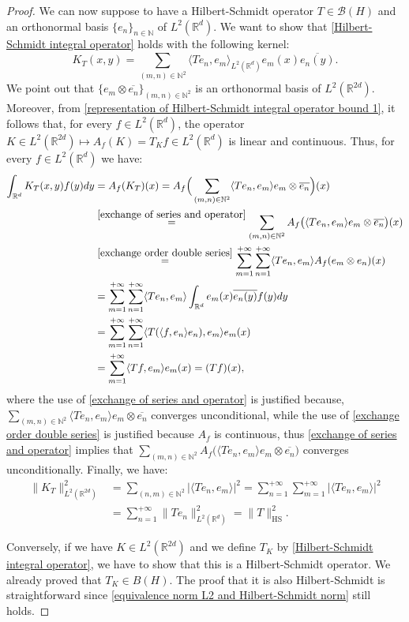 \documentclass[corpo=11pt, stile=classica, tipotesi=custom,
greek, evenboxes, english]{toptesi}
\numberwithin{equation}{chapter}
\theoremstyle{definition}
\theoremstyle{remark}
\newcommand{\R}{\mathbb{R}} %
\newcommand{\N}{\mathbb{N}} %
\newcommand{\B}{\mathscr{B}} %
\begin{document}
\begin{proof}
	We can now suppose to have a Hilbert-Schmidt operator $T \in \B(H)$ and an orthonormal basis $\{e_n\}_{n \in \N}$ of $L^2(\R^d)$. We want to show that \eqref{Hilbert-Schmidt integral operator} holds with the following kernel:
	\begin{equation}\label{integral kernel formula}
		K_T(x,y) = \sum_{(m,n) \in \N^2} \langle Te_n,e_m \rangle_{L^2(\R^d)} e_m(x)\overline{e_n(y)}.
	\end{equation}
	We point out that $\{e_m \otimes \overline{e_n}\}_{(m,n) \in \N^2}$ is an orthonormal basis of $L^2(\R^{2d})$. Moreover, from \eqref{representation of Hilbert-Schmidt integral operator bound 1}, it follows that, for every $f \in L^2(\R^d)$, the operator $K \in L^2(\R^{2d}) \mapsto A_f(K) = T_K f \in L^2(\R^d)$ is linear and continuous. Thus, for every $f \in L^2(\R^d)$ we have:
	\begin{align*}
		\int_{\R^d} K_T(x,y)f(y)dy &= A_f(K_T)(x) = A_f \Big( \sum_{(m,n) \in \N^2} \langle Te_n,e_m \rangle e_m \otimes\overline{e_n} \Big)(x) \\
								   &\overset{\ref{exchange of series and operator}}{=} \sum_{(m,n) \in \N^2} A_f \big(\langle Te_n,e_m \rangle e_m \otimes\overline{e_n}\big)(x) \\
								   &\overset{\ref{exchange order double series}}{=} \sum_{m=1}^{+\infty} \sum_{n=1}^{+\infty} \langle Te_n,e_m \rangle A_f(e_m \otimes e_n)(x) \\
								   &= \sum_{m=1}^{+\infty} \sum_{n=1}^{+\infty} \langle Te_n,e_m \rangle \int_{\R^d} e_m(x)\overline{e_n(y)}f(y) dy \\
								   &= \sum_{m=1}^{+\infty} \sum_{n=1}^{+\infty} \langle T(\langle f,e_n\rangle e_n), e_m \rangle e_m(x) \\
								   &= \sum_{m=1}^{+\infty} \langle Tf, e_m \rangle e_m(x) = (Tf)(x), 
	\end{align*} 
	where the use of \ref{exchange of series and operator} is justified because, $\sum_{(m,n) \in \N^2} \langle Te_n,e_m \rangle e_m \otimes\overline{e_n}$ converges unconditional, while the use of \ref{exchange order double series} is justified because $A_f$ is continuous, thus \eqref{exchange of series and operator} implies that $\sum_{(m,n) \in \N^2} A_f \big(\langle Te_n,e_m \rangle e_m \otimes\overline{e_n}\big)$ converges unconditionally. Finally, we have:
	\begin{equation}\label{equivalence norm L2 and Hilbert-Schmidt norm}
		\begin{aligned}
			\|K_T\|_{L^2(\R^{2d})}^2 &= \sum_{(n,m) \in \N^2} |\langle Te_n,e_m \rangle|^2 = \sum_{n=1}^{+\infty} \sum_{m=1}^{+\infty} |\langle Te_n,e_m \rangle|^2 \\
			&= \sum_{n=1}^{+\infty} \|T e_n\|^2_{L^2(\R^d)} = \|T\|_{\mathrm{HS}}^2.
		\end{aligned}		
	\end{equation}

	Conversely, if we have $K \in L^2(\R^{2d})$ and we define $T_K$ by \eqref{Hilbert-Schmidt integral operator}, we have to show that this is a Hilbert-Schmidt operator. We already proved that $T_K \in B(H)$. The proof that it is also Hilbert-Schmidt is straightforward since \eqref{equivalence norm L2 and Hilbert-Schmidt norm} still holds.
\end{proof}
\end{document}
